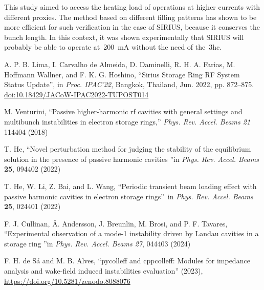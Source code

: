 \documentclass
[
    a4paper,
    biblatex,     %
]{jacow}
\begin{document}
This study aimed to access the heating load of operations at higher currents with different proxies. The method based on different filling patterns has shown to be more efficient for such verification in the case of SIRIUS, because it conserves the bunch length. In this context, it was shown experimentally that SIRIUS will probably be able to operate at~\SI{200}{\milli\ampere} without the need of the~\gls{3hc}. 
%
%
%
	{\printbibliography}%
	{%
	
	\begin{thebibliography}{9} %

   A. P. B. Lima, I. Carvalho de Almeida, D. Daminelli, R. H. A. Farias, M. Hoffmann Wallner, and F. K. G. Hoshino,
   \textquotedblleft{Sirius Storage Ring RF System Status Update}\textquotedblright,
   in \emph{Proc. IPAC’22}, Bangkok, Thailand, Jun. 2022, pp. 872--875.
   \url{doi:10.18429/JACoW-IPAC2022-TUPOST014}

    M. Venturini,
    ``Passive higher-harmonic rf cavities with general settings and multibunch instabilities in electron storage rings,''
    \emph{Phys. Rev. Accel. Beams 21} 114404 (2018)

    T. He,
    \textquotedblleft Novel perturbation method for judging the stability of the equilibrium solution in the presence of passive harmonic cavities \textquotedblright in
    \emph{Phys. Rev. Accel. Beams} \textbf{25}, 094402 (2022)

    T. He, W. Li, Z. Bai, and L. Wang,
    \textquotedblleft Periodic transient beam loading effect with passive harmonic cavities in electron storage rings\textquotedblright~in \emph{Phys. Rev. Accel. Beams} \textbf{25}, 024401 (2022)
    
    F. J. Cullinan, \AA{}. Andersson, J. Breunlin, M. Brosi, and P. F. Tavares,
    \textquotedblleft Experimental observation of a mode-1 instability driven by Landau cavities in a storage ring \textquotedblright in \emph{Phys. Rev. Accel. Beams 27}, 044403 (2024)

    F. H. de Sá and M. B. Alves,
    ``pycolleff and cppcolleff: Modules for impedance analysis and wake-field induced instabilities evaluation'' (2023),
    \url{https://doi.org/10.5281/zenodo.8088076}


\end{thebibliography}}
\end{document}
